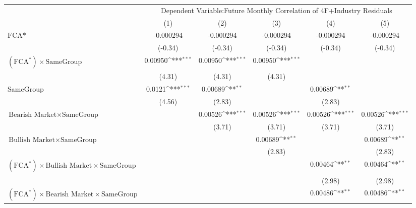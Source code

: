 {
\def\sym#1{\ifmmode^{#1}\else\(^{#1}\)\fi}
\begin{tabular}{l*{5}{c}}
\hline\hline
                &\multicolumn{5}{c}{Dependent Variable:Future Monthly Correlation of 4F+Industry Residuals}    \\\cmidrule(lr){2-6}
                &\multicolumn{1}{c}{(1)}         &\multicolumn{1}{c}{(2)}         &\multicolumn{1}{c}{(3)}         &\multicolumn{1}{c}{(4)}         &\multicolumn{1}{c}{(5)}         \\
\hline
$ \text{FCA*} $ &-0.000294         &-0.000294         &-0.000294         &-0.000294         &-0.000294         \\
                &  (-0.34)         &  (-0.34)         &  (-0.34)         &  (-0.34)         &  (-0.34)         \\
[1em]
 $ (\text{FCA}^*) \times {\text{SameGroup} }  $ &  0.00950\sym{***}&  0.00950\sym{***}&  0.00950\sym{***}&                  &                  \\
                &   (4.31)         &   (4.31)         &   (4.31)         &                  &                  \\
[1em]
SameGroup       &   0.0121\sym{***}&  0.00689\sym{**} &                  &  0.00689\sym{**} &                  \\
                &   (4.56)         &   (2.83)         &                  &   (2.83)         &                  \\
[1em]
$ {\text{Bearish Market} } \times {\text{SameGroup} }  $ &                  &  0.00526\sym{***}&  0.00526\sym{***}&  0.00526\sym{***}&  0.00526\sym{***}\\
                &                  &   (3.71)         &   (3.71)         &   (3.71)         &   (3.71)         \\
[1em]
$ {\text{Bullish Market} } \times {\text{SameGroup} }  $ &                  &                  &  0.00689\sym{**} &                  &  0.00689\sym{**} \\
                &                  &                  &   (2.83)         &                  &   (2.83)         \\
[1em]
$ (\text{FCA}^*) \times {\text{Bullish Market}} \times {\text{SameGroup} }  $ &                  &                  &                  &  0.00464\sym{**} &  0.00464\sym{**} \\
                &                  &                  &                  &   (2.98)         &   (2.98)         \\
[1em]
$ (\text{FCA}^*) \times {\text{Bearish Market}} \times {\text{SameGroup} }  $ &                  &                  &                  &  0.00486\sym{**} &  0.00486\sym{**} \\

\end{tabular}}
